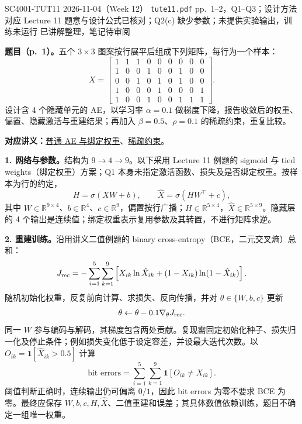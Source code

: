 
\begingroup
\linespread{1.15}\selectfont
\setlength{\parskip}{0.4em}
\renewcommand{\recordid}[1]{}
\renewcommand{\relatedtopic}[2]{\hyperref[topic:#1]{#2}}
\label{tutorial:SC4001-TUT11}

\tutorialmeta
  {SC4001-TUT11}
  {2026-11-04（Week 12）}
  {\texttt{tute11.pdf} pp.~1--2，Q1--Q3；设计方法对应 Lecture 11}
  {题意与设计公式已核对；Q2(c) 缺少参数；未提供实验输出，训练未运行}
  {已讲解整理，笔记待审阅}

\nopagebreak[4]
\textbf{题目（p.~1）。}五个 $3\times3$ 图案按行展平后组成下列矩阵，每行为一个样本：
\[
X=\begin{bmatrix}
1&1&1&0&0&0&0&0&0\\
1&0&0&1&0&0&1&0&0\\
0&0&1&0&1&0&1&0&0\\
1&0&0&0&1&0&0&0&1\\
1&0&0&1&0&0&1&1&1
\end{bmatrix}.
\]
设计含 4 个隐藏单元的 AE，以学习率 $\alpha=0.1$ 做梯度下降，报告收敛后的权重、偏置、隐藏激活与重建结果；再加入 $\beta=0.5$、$\rho=0.1$ 的稀疏约束，重复比较。

\textbf{对应讲义：}\relatedtopic{SC4001-L11-T01}{普通 AE 与绑定权重}、\relatedtopic{SC4001-L11-T03}{稀疏约束}。

\textbf{1. 网络与参数。}结构为 $9\to4\to9$。以下采用 Lecture 11 例题的 sigmoid 与 tied weights（绑定权重）方案；Q1 本身未指定激活函数、损失及是否绑定权重。按样本为行的约定，
\[
H=\sigma(XW+b),\qquad \hat X=\sigma(HW^\top+c),
\]
其中 $W\in\mathbb R^{9\times4}$、$b\in\mathbb R^4$、$c\in\mathbb R^9$，偏置按行广播；$H\in\mathbb R^{5\times4}$，$\hat X\in\mathbb R^{5\times9}$。隐藏层的 4 个输出是连续值；绑定权重表示复用参数及其转置，不进行矩阵求逆。

\textbf{2. 重建训练。}沿用讲义二值例题的 binary cross-entropy（BCE，二元交叉熵）总和：
\[
J_{\rm rec}=-\sum_{i=1}^{5}\sum_{k=1}^{9}
\left[X_{ik}\ln\hat X_{ik}+(1-X_{ik})\ln(1-\hat X_{ik})\right].
\]
随机初始化权重，反复前向计算、求损失、反向传播，并对 $\theta\in\{W,b,c\}$ 更新
\[
\theta\leftarrow\theta-0.1\nabla_\theta J_{\rm rec}.
\]
同一 $W$ 参与编码与解码，其梯度包含两处贡献。复现需固定初始化种子、损失归一化及停止条件；例如损失变化低于设定容差，并设最大迭代次数。以 $O_{ik}=\mathbf1[\hat X_{ik}>0.5]$ 计算
\[
\text{bit errors}=\sum_{i=1}^{5}\sum_{k=1}^{9}\mathbf1[O_{ik}\ne X_{ik}].
\]
阈值判断正确时，连续输出仍可偏离 $0/1$，因此 bit errors 为零不要求 BCE 为零。最终应保存 $W,b,c,H,\hat X$、二值重建和误差；其具体数值依赖训练，题目不确定一组唯一权重。

